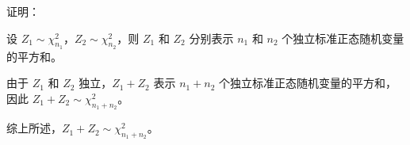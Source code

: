 \documentclass[UTF8]{report}
\theoremstyle{MyLineTheoremStyle} %
\theoremstyle{MyBlockTheoremStyle} %
\theoremstyle{MySubsubsectionStyle} %
\begin{document}
证明：

设 \(Z_1 \sim \chi^2_{n_1}\)，\(Z_2 \sim \chi^2_{n_2}\)，则 \(Z_1\) 和 \(Z_2\) 分别表示 \(n_1\) 和 \(n_2\) 个独立标准正态随机变量的平方和。

由于 \(Z_1\) 和 \(Z_2\) 独立，\(Z_1 + Z_2\) 表示 \(n_1 + n_2\) 个独立标准正态随机变量的平方和，因此 \(Z_1 + Z_2 \sim \chi^2_{n_1 + n_2}\)。

综上所述，\(Z_1 + Z_2 \sim \chi^2_{n_1 + n_2}\)。



%






\end{document}
